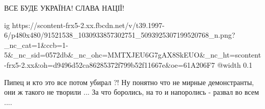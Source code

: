  
 
 
 
 

ВСЕ БУДЕ УКРАЇНА!
СЛАВА НАЦІЇ!

\ifcmt
  ig https://scontent-frx5-2.xx.fbcdn.net/v/t39.1997-6/p480x480/91521538_1030933857302751_5093925307199520768_n.png?_nc_cat=1&ccb=1-5&_nc_sid=0572db&_nc_ohc=MMTXJEU6G7gAX8SkEUO&_nc_ht=scontent-frx5-2.xx&oh=d9496d52ca86285372f799b52f11667e&oe=61A206F7
  @width 0.1
\fi


Пипец и кто это все потом убирал ?! Ну понятно что не мирные демонстранты, они
ж такого не творили ... За что боролись, на то и напоролись - развал во всем
....

